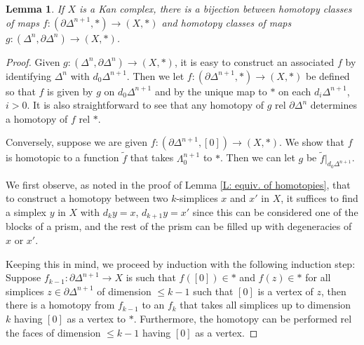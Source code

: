 \documentclass[12pt]{article}
\theoremstyle{plain}
\newtheorem{lemma}[theorem]{Lemma}
\theoremstyle{definition}
\theoremstyle{remark}
\newcommand{\td}[1]{\tilde{#1}}
\newcommand{\bd}{\partial}
\begin{document}
\begin{lemma}\label{L: lemma}
If $X$ is a Kan complex, there is a bijection between homotopy classes of maps $f\colon (\bd \Delta^{n+1},*)\to (X,*)$ and homotopy classes of maps $g\colon  (\Delta^n, \bd \Delta^n)\to (X,*)$.
\end{lemma}
\begin{proof}
Given $g\colon (\Delta^n, \bd \Delta^n)\to (X,*)$, it is easy to construct an associated $f$ by identifying $\Delta^n$ with $d_0\Delta^{n+1}$. Then we let $f\colon  (\bd \Delta^{n+1},*)\to (X,*)$ be defined so that $f$ is given by $g$ on $d_0\Delta^{n+1}$ and by the unique map to $*$ on each $d_i\Delta^{n+1}$, $i>0$. It is also straightforward to see that any homotopy of $g$ rel $\bd \Delta^n$ determines a homotopy of $f$ rel $*$. 

Conversely, suppose we are given $f\colon (\bd \Delta^{n+1},[0])\to (X,*)$. We show that $f$ is homotopic to a function $\td f$ that takes $\Lambda_0^{n+1}$ to $*$. Then we can let $g$ be $\td f|_{d_0\Delta^{n+1}}$. 


We first observe, as noted in the proof of Lemma \ref{L: equiv. of homotopies}, that to construct a homotopy between two  $k$-simplices $x$ and $x'$ in $X$, it suffices to find a simplex $y$ in $X$ with $d_ky=x$, $d_{k+1}y=x'$ since this can be considered one of the  blocks of a prism, and the rest of the prism can be filled up with degeneracies of $x$ or $x'$. 

Keeping this in mind, we proceed by induction with the following induction step: Suppose $f_{k-1}\colon \bd \Delta^{n+1}\to X$ is such that $f([0])\in *$ and $f(z)\in *$ for all simplices $z\in\bd \Delta^{n+1}$ of dimension $\leq k-1$ such that $[0]$ is a vertex of $z$, then there is a homotopy from $f_{k-1}$ to an $f_k$ that takes all simplices up to dimension $k$ having $[0]$ as a vertex to $*$. Furthermore, the homotopy can be performed rel the faces of dimension $\leq k-1$ having $[0]$ as a vertex.


\end{proof}
\end{document}
